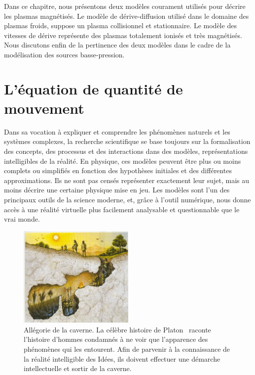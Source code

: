 
\label{ApproximationsEqMvt}
\begin{refsection}
Dans ce chapitre, nous présentons deux modèles courament utilisés 
pour décrire les plasmas magnétisés. Le modèle de dérive-diffusion utilisé dans
le domaine des plasmas froids, suppose un plasma collisionnel et stationnaire.
Le modèle des vitesses de dérive représente des plasmas totalement ionisés et très
magnétisés. Nous discutons enfin de la pertinence des deux modèles dans le cadre
de la modélisation des sources basse-pression.

\section{L'équation de quantité de mouvement}

Dans sa vocation à expliquer et comprendre les phénomènes naturels et les
systèmes complexes, la recherche scientifique se base toujours sur la
formalisation des concepts, des processus et des interactions dans des
modèles, représentations intelligibles de la réalité. En physique, ces modèles
peuvent être plus ou moins complets ou simplifiés en fonction des hypothèses
initiales et des différentes approximations. Ils ne sont
pas censés représenter exactement leur sujet, mais au moins décrire une
certaine physique mise en jeu.
Les modèles sont l'un des
principaux outils de la science moderne, et, grâce à l'outil numérique, nous
donne accès à une réalité virtuelle plus facilement analysable et questionnable
que le vrai monde.

\begin{figure}[!htbp]
    \centering
	\includegraphics[width=0.5\textwidth]{figures/1-cave.jpg}
	\caption{Allégorie de la caverne. La célèbre histoire de
	Platon~\parencite{Platon} raconte l'histoire d'hommes condamnés à ne voir que
	l'apparence des phénomènes qui les entourent. Afin de parvenir à la connaissance de la réalité
	intelligible des Idées, ils doivent effectuer une démarche intellectuelle
	et sortir de la caverne.}\label{caverne}
\end{figure}



\end{refsection}
